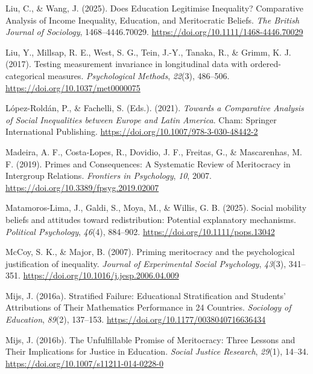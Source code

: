 \documentclass[
  13pt,
]{article}
\newlength{\cslhangindent}
\newenvironment{CSLReferences}[2] %
 {\begin{list}{}{%
  \setlength{\itemindent}{0pt}
  \setlength{\leftmargin}{0pt}
  \setlength{\parsep}{0pt}
  \ifodd #1
   \setlength{\leftmargin}{\cslhangindent}
   \setlength{\itemindent}{-1\cslhangindent}
  \fi
  \setlength{\itemsep}{#2\baselineskip}}}
 {\end{list}}
\begin{document}
\begin{CSLReferences}{1}{0}
Liu, C., \& Wang, J. (2025). Does {Education Legitimise Inequality}?
{Comparative Analysis} of {Income Inequality}, {Education}, and
{Meritocratic Beliefs}. \emph{The British Journal of Sociology},
1468--4446.70029. \url{https://doi.org/10.1111/1468-4446.70029}

Liu, Y., Millsap, R. E., West, S. G., Tein, J.-Y., Tanaka, R., \& Grimm,
K. J. (2017). Testing measurement invariance in longitudinal data with
ordered-categorical measures. \emph{Psychological Methods},
\emph{22}(3), 486--506. \url{https://doi.org/10.1037/met0000075}

López-Roldán, P., \& Fachelli, S. (Eds.). (2021). \emph{Towards a
{Comparative Analysis} of {Social Inequalities} between {Europe} and
{Latin America}}. Cham: Springer International Publishing.
\url{https://doi.org/10.1007/978-3-030-48442-2}

Madeira, A. F., Costa-Lopes, R., Dovidio, J. F., Freitas, G., \&
Mascarenhas, M. F. (2019). Primes and {Consequences}: {A Systematic
Review} of {Meritocracy} in {Intergroup Relations}. \emph{Frontiers in
Psychology}, \emph{10}, 2007.
\url{https://doi.org/10.3389/fpsyg.2019.02007}

Matamoros-Lima, J., Galdi, S., Moya, M., \& Willis, G. B. (2025). Social
mobility beliefs and attitudes toward redistribution: {Potential}
explanatory mechanisms. \emph{Political Psychology}, \emph{46}(4),
884--902. \url{https://doi.org/10.1111/pops.13042}

McCoy, S. K., \& Major, B. (2007). Priming meritocracy and the
psychological justification of inequality. \emph{Journal of Experimental
Social Psychology}, \emph{43}(3), 341--351.
\url{https://doi.org/10.1016/j.jesp.2006.04.009}

Mijs, J. (2016a). Stratified {Failure}: {Educational Stratification} and
{Students}' {Attributions} of {Their Mathematics Performance} in 24
{Countries}. \emph{Sociology of Education}, \emph{89}(2), 137--153.
\url{https://doi.org/10.1177/0038040716636434}

Mijs, J. (2016b). The {Unfulfillable Promise} of {Meritocracy}: {Three
Lessons} and {Their Implications} for {Justice} in {Education}.
\emph{Social Justice Research}, \emph{29}(1), 14--34.
\url{https://doi.org/10.1007/s11211-014-0228-0}


\end{CSLReferences}
\end{document}
